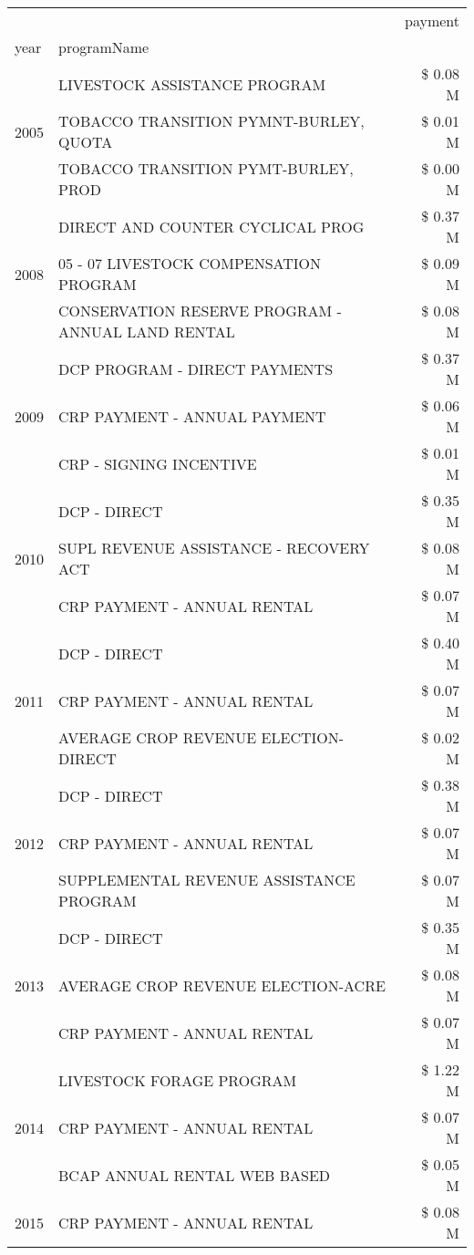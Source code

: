 \begin{tabular}{llr}
\toprule
 &  & payment \\
year & programName &  \\
\midrule
\multirow[t]{3}{*}{2005} & LIVESTOCK ASSISTANCE PROGRAM & \$ 0.08 M \\
 & TOBACCO TRANSITION PYMNT-BURLEY, QUOTA & \$ 0.01 M \\
 & TOBACCO TRANSITION PYMT-BURLEY, PROD & \$ 0.00 M \\
\cline{1-3}
\multirow[t]{3}{*}{2008} & DIRECT AND COUNTER CYCLICAL PROG & \$ 0.37 M \\
 & 05 - 07 LIVESTOCK COMPENSATION PROGRAM & \$ 0.09 M \\
 & CONSERVATION RESERVE PROGRAM - ANNUAL LAND RENTAL & \$ 0.08 M \\
\cline{1-3}
\multirow[t]{3}{*}{2009} & DCP PROGRAM - DIRECT PAYMENTS & \$ 0.37 M \\
 & CRP PAYMENT - ANNUAL PAYMENT & \$ 0.06 M \\
 & CRP - SIGNING INCENTIVE & \$ 0.01 M \\
\cline{1-3}
\multirow[t]{3}{*}{2010} & DCP - DIRECT & \$ 0.35 M \\
 & SUPL REVENUE ASSISTANCE - RECOVERY ACT & \$ 0.08 M \\
 & CRP PAYMENT - ANNUAL RENTAL & \$ 0.07 M \\
\cline{1-3}
\multirow[t]{3}{*}{2011} & DCP - DIRECT & \$ 0.40 M \\
 & CRP PAYMENT - ANNUAL RENTAL & \$ 0.07 M \\
 & AVERAGE CROP REVENUE ELECTION-DIRECT & \$ 0.02 M \\
\cline{1-3}
\multirow[t]{3}{*}{2012} & DCP - DIRECT & \$ 0.38 M \\
 & CRP PAYMENT - ANNUAL RENTAL & \$ 0.07 M \\
 & SUPPLEMENTAL REVENUE ASSISTANCE PROGRAM & \$ 0.07 M \\
\cline{1-3}
\multirow[t]{3}{*}{2013} & DCP - DIRECT & \$ 0.35 M \\
 & AVERAGE CROP REVENUE ELECTION-ACRE & \$ 0.08 M \\
 & CRP PAYMENT - ANNUAL RENTAL & \$ 0.07 M \\
\cline{1-3}
\multirow[t]{3}{*}{2014} & LIVESTOCK FORAGE PROGRAM & \$ 1.22 M \\
 & CRP PAYMENT - ANNUAL RENTAL & \$ 0.07 M \\
 & BCAP ANNUAL RENTAL WEB BASED & \$ 0.05 M \\
\cline{1-3}
\multirow[t]{3}{*}{2015} & CRP PAYMENT - ANNUAL RENTAL & \$ 0.08 M \\

\end{tabular}
